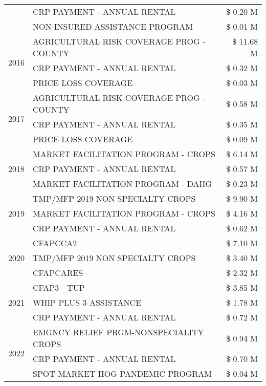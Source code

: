 \begin{tabular}{llr}
 & CRP PAYMENT - ANNUAL RENTAL & \$ 0.20 M \\
 & NON-INSURED ASSISTANCE PROGRAM & \$ 0.01 M \\
\cline{1-3}
\multirow[t]{3}{*}{2016} & AGRICULTURAL RISK COVERAGE PROG - COUNTY & \$ 11.68 M \\
 & CRP PAYMENT - ANNUAL RENTAL & \$ 0.32 M \\
 & PRICE LOSS COVERAGE & \$ 0.03 M \\
\cline{1-3}
\multirow[t]{3}{*}{2017} & AGRICULTURAL RISK COVERAGE PROG - COUNTY & \$ 0.58 M \\
 & CRP PAYMENT - ANNUAL RENTAL & \$ 0.35 M \\
 & PRICE LOSS COVERAGE & \$ 0.09 M \\
\cline{1-3}
\multirow[t]{3}{*}{2018} & MARKET FACILITATION PROGRAM - CROPS & \$ 6.14 M \\
 & CRP PAYMENT - ANNUAL RENTAL & \$ 0.57 M \\
 & MARKET FACILITATION PROGRAM - DAHG & \$ 0.23 M \\
\cline{1-3}
\multirow[t]{3}{*}{2019} & TMP/MFP 2019 NON SPECIALTY CROPS & \$ 9.90 M \\
 & MARKET FACILITATION PROGRAM - CROPS & \$ 4.16 M \\
 & CRP PAYMENT - ANNUAL RENTAL & \$ 0.62 M \\
\cline{1-3}
\multirow[t]{3}{*}{2020} & CFAPCCA2 & \$ 7.10 M \\
 & TMP/MFP 2019 NON SPECIALTY CROPS & \$ 3.40 M \\
 & CFAPCARES & \$ 2.32 M \\
\cline{1-3}
\multirow[t]{3}{*}{2021} & CFAP3 - TUP & \$ 3.85 M \\
 & WHIP PLUS 3 ASSISTANCE & \$ 1.78 M \\
 & CRP PAYMENT - ANNUAL RENTAL & \$ 0.72 M \\
\cline{1-3}
\multirow[t]{3}{*}{2022} & EMGNCY RELIEF PRGM-NONSPECIALITY CROPS & \$ 0.94 M \\
 & CRP PAYMENT - ANNUAL RENTAL & \$ 0.70 M \\
 & SPOT MARKET HOG PANDEMIC PROGRAM & \$ 0.04 M \\
\cline{1-3}
\bottomrule
\end{tabular}

